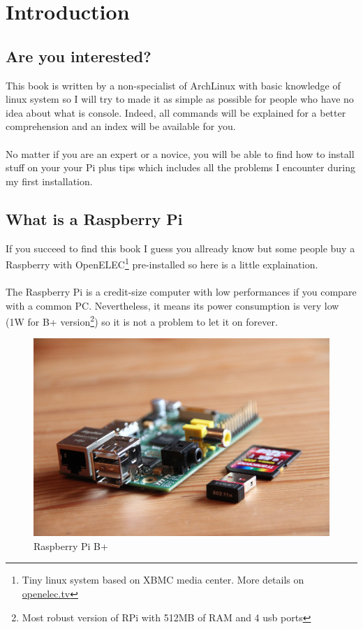 \chapter{Introduction}
	\section{Are you interested?}
This book is written by a non-specialist of ArchLinux with basic knowledge of 
linux system so I will try to made it as simple as possible for people 
who have no idea about what is console. Indeed, all commands will be 
explained for a better comprehension and an index will be available for you.
\\\\
No matter if you are an expert or a novice, you will be able to find 
how to install stuff on your your Pi plus tips which includes all the problems 
I encounter during my first installation.

	\section{What is a Raspberry Pi}
If you succeed to find this book I guess you allready know but some people 
buy a Raspberry with OpenELEC\footnote{Tiny linux system based on XBMC media center. 
More details on \href{http://openelec.tv}{openelec.tv}} pre-installed so here 
is a little explaination.
\\\\
The Raspberry Pi is a credit-size computer with low performances if you
compare with a common PC. Nevertheless, it means its power consumption is
very low (1W for B+ version\footnote{Most robust version of RPi with 512MB 
of RAM and 4 usb ports}) so it is not a problem to let it on forever. 
\newpage
\begin{figure}[h]
	\centering
	\includegraphics[scale=0.2]{images/RaspberrySize.jpg}
	\caption{Raspberry Pi B+}
	\label{figure:RaspberrySize}
\end{figure}

